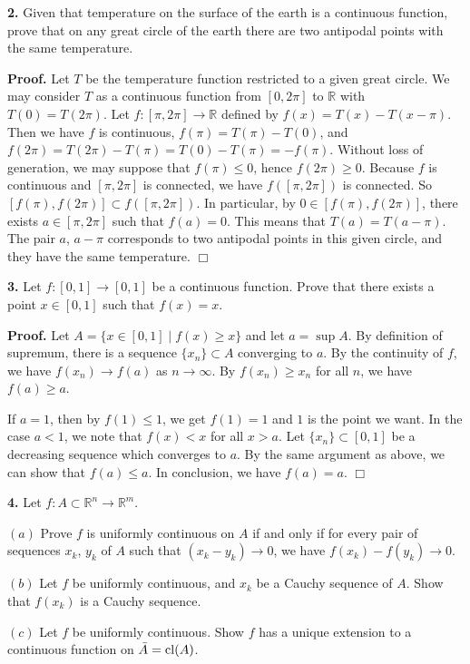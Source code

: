 \documentclass{article}
\begin{document}
    \textbf{2.} Given that temperature on the surface of the earth is a
continuous function, prove that on any great circle of the earth there
are two antipodal points with the same temperature.

\textbf{Proof.} Let $T$ be the temperature function restricted to a
given great circle. We may consider $T$ as a continuous function from
$[0,2\pi]$ to $\mathbb{R}$ with $T(0) = T(2\pi)$. Let
$f:[\pi ,2\pi]\to\mathbb{R}$ defined by $f(x) = T(x) - T(x-\pi)$. Then
we have $f$ is continuous, $f(\pi) = T(\pi) - T(0)$, and
$f(2\pi) = T(2\pi) -T(\pi) = T(0) - T(\pi) = -f(\pi)$. Without loss of
generation, we may suppose that $f(\pi) \le 0$, hence $f(2\pi) \ge 0$.
Because $f$ is continuous and $[\pi, 2\pi]$ is connected, we have
$f([\pi,2\pi])$ is connected. So
$[f(\pi),f(2\pi)]\subset f([\pi,2\pi])$. In particular, by
$0 \in [f(\pi),f(2\pi)]$, there exists $a\in [\pi,2\pi]$ such that
$f(a) = 0$. This means that $T(a) = T(a-\pi)$. The pair $a$, $a-\pi$
corresponds to two antipodal points in this given circle, and they have
the same temperature. $\Box$

    \textbf{3.} Let $f:[0,1]\to [0,1]$ be a continuous function. Prove that
there exists a point $x\in [0,1]$ such that $f(x) = x$.

\textbf{Proof.} Let $A = \{x\in [0,1] \mid f(x) \ge x\}$ and let
$a = \sup A$. By definition of supremum, there is a sequence
$\{x_n\}\subset A$ converging to $a$. By the continuity of $f$, we have
$f(x_n)\to f(a)$ as $n\to \infty$. By $f(x_n) \ge x_n$ for all $n$, we
have $f(a) \ge a$.

If $a = 1$, then by $f(1) \le 1$, we get $f(1) = 1$ and $1$ is the point
we want. In the case $a < 1$, we note that $f(x) < x$ for all $x > a$.
Let $\{x_n\}\subset [0,1]$ be a decreasing sequence which converges to
$a$. By the same argument as above, we can show that $f(a) \le a$. In
conclusion, we have $f(a) = a$. $\Box$

    \textbf{4.} Let $f:A\subset \mathbb{R}^n\to \mathbb{R}^m$.

$(a)$ Prove $f$ is uniformly continuous on $A$ if and only if for every
pair of sequences $x_k$, $y_k$ of $A$ such that $(x_k-y_k) \to 0$, we
have $f(x_k)-f(y_k)\to 0$.

$(b)$ Let $f$ be uniformly continuous, and $x_k$ be a Cauchy sequence of
$A$. Show that $f(x_k)$ is a Cauchy sequence.

$(c)$ Let $f$ be uniformly continuous. Show $f$ has a unique extension
to a continuous function on $\bar{A} = \operatorname{cl}(A)$.
\end{document}

